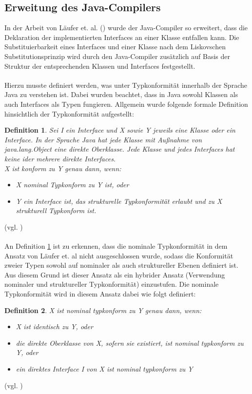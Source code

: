 \documentclass[11pt, 
ngerman,
doublespacing,
chapterinoneline, %
consistentlayout, %
]{scrartcl}
\newtheorem{definition}{Definition}
\begin{document}
\subsection{Erweitung des Java-Compilers}
In der Arbeit von Läufer et. al. (\cite{structconfjava}) wurde der Java-Compiler so erweitert, dass die Deklaration der implementierten Interfaces an einer Klasse entfallen kann. Die Substitu\-ier\-barkeit eines Interfaces und einer Klasse nach dem Liskovschen Substitutionsprinzip wird durch den Java-Compiler zusätzlich auf Basis der Struktur der entsprechenden Klassen und Interfaces festgestellt.\\\\
Hierzu musste definiert werden, was unter Typkonfor\-mität innerhalb der Sprache Java zu verstehen ist. Dabei wurden beachtet, dass in Java sowohl Klassen als auch Interfaces als Typen fungieren. Allgemein wurde folgende formale Definition hinsichtlich der Typkonfor\-mität aufgestellt:
\begin{definition}\label{def_allgTypkonfJava}
Sei \emph{I} ein Interface und \emph{X} sowie \emph{Y} jeweils eine Klasse oder ein Interface.
In der Sprache Java hat jede Klasse mit Außnahme von \emph{java.lang.Object} eine direkte Oberklasse. Jede Klasse und jedes Interfaces hat keine ider mehrere direkte Interfaces.\\
\emph{X} ist konform zu \emph{Y} genau dann, wenn:
\begin{itemize}
\item\emph{X} nominal Typkonform zu \emph{Y} ist, oder
\item\emph{Y} ein Interface ist, das strukturelle Typkonformität erlaubt und zu \emph{X} struktu\-rell Typkonform ist.
\end{itemize}
\end{definition}(vgl. \cite{structconfjava}) \\\\
An Definition \ref{def_allgTypkonfJava} ist zu erkennen, dass die nominale Typkonformität in dem Ansatz von Läufer et. al \cite{structconfjava} nicht ausgeschlossen wurde, sodass die Konformität zweier Typen sowohl auf nominaler als auch struktureller Ebenen definiert ist. Aus diesem Grund ist dieser Ansatz als ein hybrider Ansatz (Verwendung nominaler und struktureller Typkonformität) einzustufen. Die nominale Typkonformität wird in diesem Ansatz dabei wie folgt definiert:
\begin{definition}\label{def_nominalTypkonf}
\emph{X} ist nominal typkonform zu \emph{Y} genau dann, wenn:
\begin{itemize}
\item \emph{X} ist identisch zu \emph{Y}, oder
\item die direkte Oberklasse von \emph{X}, sofern sie existiert, ist nominal typkonform zu \emph{Y}, oder
\item ein direktes Interface \emph{I} von \emph{X} ist nominal typkonform zu \emph{Y}
\end{itemize}
\end{definition}(vgl. \cite{structconfjava})\\\\
\end{document}
